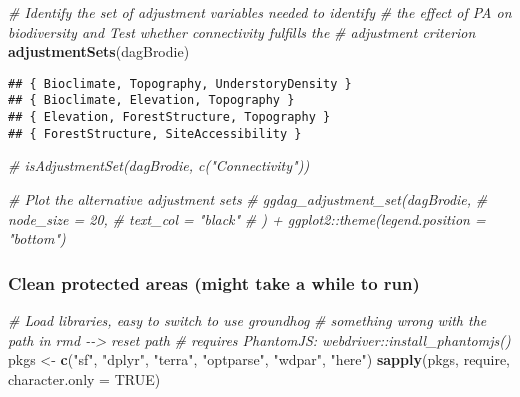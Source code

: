 \documentclass[
]{article}
\newenvironment{Shaded}{\begin{snugshade}}{\end{snugshade}}
\newcommand{\AttributeTok}[1]{\textcolor[rgb]{0.13,0.29,0.53}{#1}}
\newcommand{\CommentTok}[1]{\textcolor[rgb]{0.56,0.35,0.01}{\textit{#1}}}
\newcommand{\ConstantTok}[1]{\textcolor[rgb]{0.56,0.35,0.01}{#1}}
\newcommand{\FunctionTok}[1]{\textcolor[rgb]{0.13,0.29,0.53}{\textbf{#1}}}
\newcommand{\NormalTok}[1]{#1}
\newcommand{\OtherTok}[1]{\textcolor[rgb]{0.56,0.35,0.01}{#1}}
\newcommand{\StringTok}[1]{\textcolor[rgb]{0.31,0.60,0.02}{#1}}
\begin{document}
\begin{Shaded}
\begin{Highlighting}[]
\CommentTok{\# Identify the set of adjustment variables needed to identify }
\CommentTok{\# the effect of PA on biodiversity and Test whether connectivity fulfills the }
\CommentTok{\# adjustment criterion}
\FunctionTok{adjustmentSets}\NormalTok{(dagBrodie)}
\end{Highlighting}
\end{Shaded}

\begin{verbatim}
## { Bioclimate, Topography, UnderstoryDensity }
## { Bioclimate, Elevation, Topography }
## { Elevation, ForestStructure, Topography }
## { ForestStructure, SiteAccessibility }
\end{verbatim}

\begin{Shaded}
\begin{Highlighting}[]
\CommentTok{\# isAdjustmentSet(dagBrodie, c("Connectivity"))}

\CommentTok{\# Plot the alternative adjustment sets}
\CommentTok{\# ggdag\_adjustment\_set(dagBrodie, }
\CommentTok{\#                      node\_size = 20, }
\CommentTok{\#                      text\_col = "black"}
\CommentTok{\# ) + ggplot2::theme(legend.position = "bottom")}
\end{Highlighting}
\end{Shaded}

\hypertarget{clean-protected-areas-might-take-a-while-to-run}{%
\subsubsection{Clean protected areas (might take a while to
run)}\label{clean-protected-areas-might-take-a-while-to-run}}

\begin{Shaded}
\begin{Highlighting}[]
\CommentTok{\# Load libraries, easy to switch to use groundhog}
\CommentTok{\# something wrong with the path in rmd {-}{-}\textgreater{} reset path}
\CommentTok{\# requires PhantomJS: webdriver::install\_phantomjs()}
\NormalTok{pkgs }\OtherTok{\textless{}{-}} \FunctionTok{c}\NormalTok{(}\StringTok{"sf"}\NormalTok{, }\StringTok{"dplyr"}\NormalTok{, }\StringTok{"terra"}\NormalTok{, }\StringTok{"optparse"}\NormalTok{, }\StringTok{"wdpar"}\NormalTok{, }\StringTok{"here"}\NormalTok{)}
\FunctionTok{sapply}\NormalTok{(pkgs, require, }\AttributeTok{character.only =} \ConstantTok{TRUE}\NormalTok{)}
\end{Highlighting}
\end{Shaded}
\end{document}
